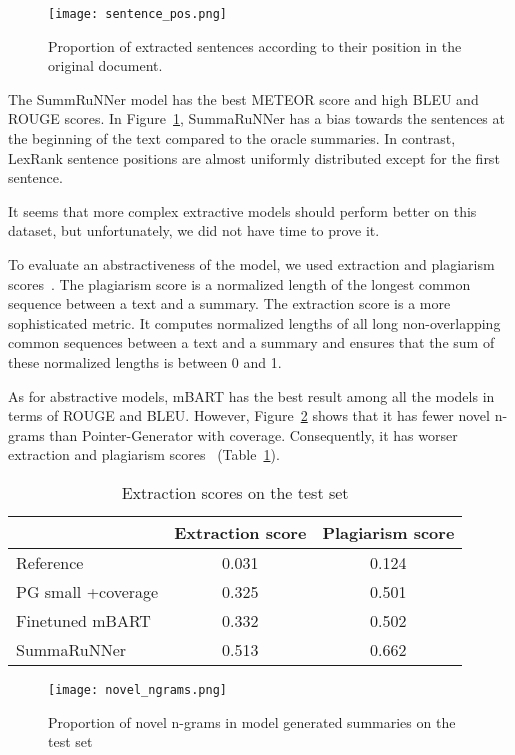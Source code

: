 \documentclass[runningheads]{llncs}
\begin{document}
\begin{figure}
\texttt{[image: sentence\_pos.png]}
\caption{Proportion of extracted sentences according to their position in the original document.}
\label{fig3}
\end{figure}

The SummRuNNer model has the best METEOR score and high BLEU and ROUGE scores. In Figure~\ref{fig3}, SummaRuNNer has a bias towards the sentences at the beginning of the text compared to the oracle summaries. In contrast, LexRank sentence positions are almost uniformly distributed except for the first sentence.

It seems that more complex extractive models should perform better on this dataset, but unfortunately, we did not have time to prove it.

To evaluate an abstractiveness of the model, we used extraction and plagiarism scores~\cite{ext_score}. The plagiarism score is a normalized length of the longest common sequence between a text and a summary. The extraction score is a more sophisticated metric. It computes normalized lengths of all long non-overlapping common sequences between a text and a summary and ensures that the sum of these normalized lengths is between 0 and 1.

As for abstractive models, mBART has the best result among all the models in terms of ROUGE and BLEU. However, Figure~\ref{fig4} shows that it has fewer novel n-grams than Pointer-Generator with coverage. Consequently, it has worser extraction and plagiarism scores~\cite{ext_score} (Table~\ref{tab4}).

\begin{table}[htbp]
\caption{Extraction scores on the test set}\label{tab4}
\centering
\begin{tabular}{|l|c|c|}\hline
& Extraction score & Plagiarism score\\\hline
Reference & 0.031 & 0.124\\
PG small +coverage & 0.325 & 0.501\\
Finetuned mBART & 0.332 & 0.502\\
SummaRuNNer & 0.513 & 0.662 \\\hline
\end{tabular}
\end{table}

\begin{figure}
\texttt{[image: novel\_ngrams.png]}
\caption{Proportion of novel n-grams in model generated summaries on the test set} \label{fig4}
\end{figure}
\end{document}
